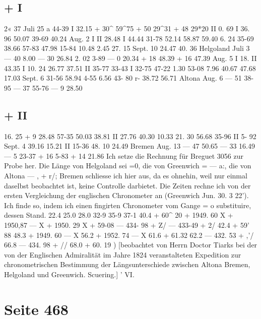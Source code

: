 \documentclass[10pt,a4paper]{article}
\begin{document}
\subsection*{+    I\glqq{}}

2«  37
Juli    25
a
44-39
I
32.15
+  30\glqq{}\textasciicircum{}
59\textasciicircum{}75
+  50\glqq{}
\textbullet{}  29\textasciicircum{}31
+  48\glqq{}
29*20
II
0.  69
I
36.  96
50.07
39-69
40.24
Aug.    2
I
II
28.48
I
44.44
31-78
52.14
58.87
59.40
6.  24
35-69
38.66
57-83
47.98
15-84
10.48
2.45
27.  15
Sept.  10
24.47
40.  36
Helgoland
Juli     3
---  40
8.00
---  30
26.84
2.  02
3-89
---    0
20.34
+  18
48.39
+  16
47.39
Aug.    5
I
18.  II
43.35
I
10.  24
26.77
37.51
II
35-77
33-43
I
32-75
47-22
1.30
53-08
7.96
40.67
47.68
17.03
Sept.   6
31-56
58.94
4-55
6.56
43-  80
r-
38.72
56.71
Altona
Aug.     6
---  51
38-95
---  37
55-76
---    9
28.50
\subsection*{+  II}

16.  25
+    9
28.48
57-35
50.03
38.81
II
27.76
40.30
10.33
21.  30
56.68
35-96
II
5-  92
Sept.   4
39.16
15.21
II
15-36
48. 10
24.49
Bremen
Aug.  13
---  47
50.65
---  33
16.49
---    5
23-37
+  16
5-83
+  14
21.86
Ich  setze  die  Rechnung  für  Breguet  3056  zur  Probe  her.  Die  Länge  von  Helgoland  sei  =0,  die
von  Greenwich  =  ---  a:,  die  von  Altona  ---  ,  +  r/;  Bremen  schliesse  ich  hier  aus,  da  es  ohnehin,  weil  nur
einmal  daselbst  beobachtet  ist,  keine  Controlle  darbietet.
Die  Zeiten  rechne  ich  von  der  ersten  Vergleichung  der  englischen  Chronometer  an  (Greenwich
Jun.  30.  3\glqq{}  22\glqq{}').
Ich  finde  so,  indem  ich  einen  fingirten  Chronometer  vom  Gange    =  o    substituire,   dessen  Stand.
22.4
25.0
28.0
32-9
35-9
37-1
40.4
+      60\textasciicircum{}  20
+  1949.  60   X
+  1950,87  ---  X
+  1950.  29   X
+    59-08
---  434-  98  +  Z/
---  433-49  +  2/
42.4 +
59' 88
48.3 +
1949.  60  ---  X
56.2
+
1952.  74  ---  X
61.6 +
61.32
62.2
---
432.  53  +  ,'/
66.8
---
434.  98  +  //
68.0 +
60. 19
)  [beobachtet  von  Herrn  Doctor  Tiarks  bei  der  von  der  Englischen  Admiralität  im  Jahre  1824
veranstalteten  Expedition  zur  chronometrischen  Bestimmung  der  Längsunterschiede  zwischen  Altona
Bremen,  Helgoland  und  Greenwich.     Scuering.]  '
VI.

\newpage
\section*{Seite 468}
\end{document}
